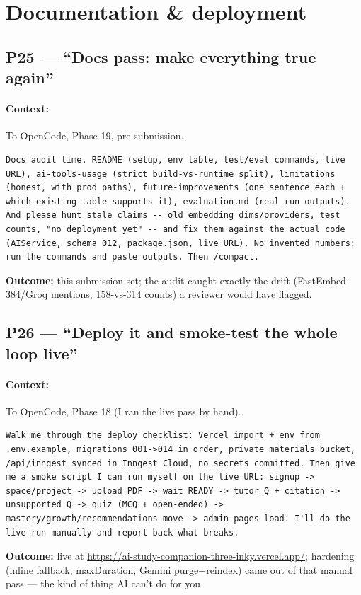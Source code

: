 \documentclass[11pt,a4paper]{article}
\begin{document}
\section{Documentation \& deployment}

\subsection{P25 --- ``Docs pass: make everything true again''}
\paragraph{Context:} To OpenCode, Phase 19, pre-submission.
\begin{lstlisting}
Docs audit time. README (setup, env table, test/eval commands, live URL), ai-tools-usage (strict build-vs-runtime split), limitations (honest, with prod paths), future-improvements (one sentence each + which existing table supports it), evaluation.md (real run outputs). And please hunt stale claims -- old embedding dims/providers, test counts, "no deployment yet" -- and fix them against the actual code (AIService, schema 012, package.json, live URL). No invented numbers: run the commands and paste outputs. Then /compact.
\end{lstlisting}
\textbf{Outcome:} this submission set; the audit caught exactly the drift (FastEmbed-384/Groq mentions, 158-vs-314 counts) a reviewer would have flagged.

\subsection{P26 --- ``Deploy it and smoke-test the whole loop live''}
\paragraph{Context:} To OpenCode, Phase 18 (I ran the live pass by hand).
\begin{lstlisting}
Walk me through the deploy checklist: Vercel import + env from .env.example, migrations 001->014 in order, private materials bucket, /api/inngest synced in Inngest Cloud, no secrets committed. Then give me a smoke script I can run myself on the live URL: signup -> space/project -> upload PDF -> wait READY -> tutor Q + citation -> unsupported Q -> quiz (MCQ + open-ended) -> mastery/growth/recommendations move -> admin pages load. I'll do the live run manually and report back what breaks.
\end{lstlisting}
\textbf{Outcome:} live at \url{https://ai-study-companion-three-inky.vercel.app/}; hardening (inline fallback, maxDuration, Gemini purge+reindex) came out of that manual pass --- the kind of thing AI can't do for you.
\end{document}
